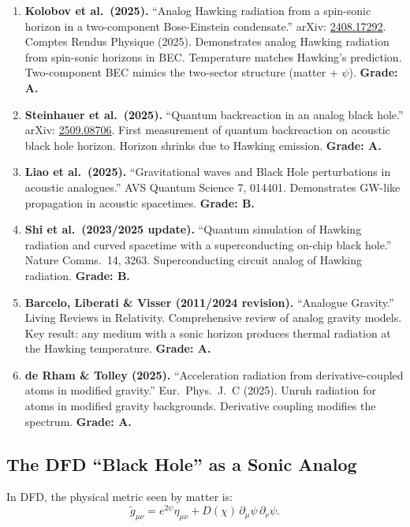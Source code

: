 \documentclass[11pt,a4paper]{article}
\begin{document}
\begin{enumerate}
\item \textbf{Kolobov et al.\ (2025).} ``Analog Hawking radiation from a spin-sonic horizon in a two-component Bose-Einstein condensate.'' arXiv: \href{https://arxiv.org/abs/2408.17292}{2408.17292}. Comptes Rendus Physique (2025). Demonstrates analog Hawking radiation from spin-sonic horizons in BEC. Temperature matches Hawking's prediction. Two-component BEC mimics the two-sector structure (matter + $\psi$). \textbf{Grade: A.}

\item \textbf{Steinhauer et al.\ (2025).} ``Quantum backreaction in an analog black hole.'' arXiv: \href{https://arxiv.org/abs/2509.08706}{2509.08706}. First measurement of quantum backreaction on acoustic black hole horizon. Horizon shrinks due to Hawking emission. \textbf{Grade: A.}

\item \textbf{Liao et al.\ (2025).} ``Gravitational waves and Black Hole perturbations in acoustic analogues.'' AVS Quantum Science 7, 014401. Demonstrates GW-like propagation in acoustic spacetimes. \textbf{Grade: B.}

\item \textbf{Shi et al.\ (2023/2025 update).} ``Quantum simulation of Hawking radiation and curved spacetime with a superconducting on-chip black hole.'' Nature Comms.\ 14, 3263. Superconducting circuit analog of Hawking radiation. \textbf{Grade: B.}

\item \textbf{Barcelo, Liberati \& Visser (2011/2024 revision).} ``Analogue Gravity.'' Living Reviews in Relativity. Comprehensive review of analog gravity models. Key result: any medium with a sonic horizon produces thermal radiation at the Hawking temperature. \textbf{Grade: A.}

\item \textbf{de Rham \& Tolley (2025).} ``Acceleration radiation from derivative-coupled atoms in modified gravity.'' Eur.\ Phys.\ J.\ C (2025). Unruh radiation for atoms in modified gravity backgrounds. Derivative coupling modifies the spectrum. \textbf{Grade: A.}
\end{enumerate}

\subsection{The DFD ``Black Hole'' as a Sonic Analog}

In DFD, the physical metric seen by matter is:
\begin{equation}
\tilde{g}_{\mu\nu} = e^{2\psi}\eta_{\mu\nu} + D(\chi)\,\partial_\mu\psi\,\partial_\nu\psi.
\end{equation}
\end{document}
